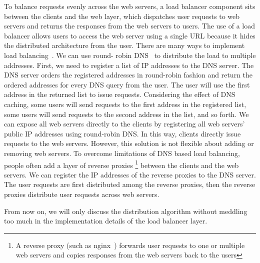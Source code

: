 To balance requests evenly across the web servers, a load balancer component
sits between the clients and the web layer, which dispatches user requests to
web servers and returns the responses from the web servers to users. The use
of a load balancer allows users to access the web server using a single URL
because it hides the distributed architecture from the user. There are many
ways to implement load balancing~\cite{cardellini2002state}. We can use round-
robin DNS~\cite{} to distribute the load to multiple addresses. First, we need
to register a list of IP addresses to the DNS server. The DNS server orders
the registered addresses in round-robin fashion
 and return the ordered
addresses for every DNS query from the user.  The user will use the first
address in the returned list to issue requests. Considering the effect of DNS
caching, some users will send requests to the first address in the registered
list, some users will send requests to the second address in the list, and so
forth. We can expose  all web servers directly to the clients  by registering
all web servers' public IP addresses using round-robin DNS. In this way,
clients directly issue requests to the web servers. However, this solution is
not flexible about adding or removing web servers. To overcome limitations of
DNS based load balancing, people often add a layer of reverse proxies \footnote{A
reverse proxy (such as nginx~\cite{nginx})  forwards user requests to one or
multiple web servers and copies responses from the web servers back to the
users} between the clients and the web servers. We can register the IP
addresses of the reverse proxies to the DNS server. The user requests are
first distributed among the reverse proxies, then  the reverse proxies
distribute user requests across web servers.

From now on, we will only discuss the distribution algorithm without meddling too much
in the implementation details of the load balancer layer.
%
%




